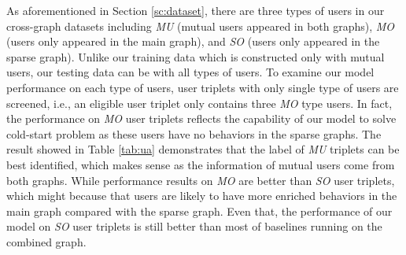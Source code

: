 As aforementioned in Section \ref{sc:dataset}, there are three types of users in our cross-graph datasets including \textit{MU} (mutual users appeared in both graphs),  \textit{MO} (users only appeared in the main graph), and  \textit{SO} (users only appeared in the sparse graph). Unlike our training data which is constructed only with mutual users, our testing data can be with all types of users. To examine our model performance on each type of users, user triplets with only single type of users are screened, i.e., an eligible user triplet only contains three \textit{MO} type users. In fact, the performance on \textit{MO} user triplets reflects the capability of our model to solve cold-start problem as these users have no behaviors in the sparse graphs. The result showed in Table \ref{tab:ua} demonstrates that the label of \textit{MU} triplets can be best identified, which makes sense as the information of mutual users come from both graphs. While performance results on \textit{MO} are better than \textit{SO} user triplets, which might because that users are likely to have more enriched behaviors in the main graph compared with the sparse graph. Even that, the performance of our model on \textit{SO} user triplets is still better than most of baselines running on the combined graph.

